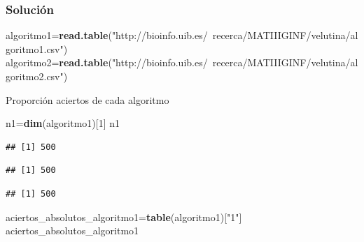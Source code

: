 \documentclass[
]{article}
\newenvironment{Shaded}{\begin{snugshade}}{\end{snugshade}}
\newcommand{\DecValTok}[1]{\textcolor[rgb]{0.00,0.00,0.81}{#1}}
\newcommand{\KeywordTok}[1]{\textcolor[rgb]{0.13,0.29,0.53}{\textbf{#1}}}
\newcommand{\NormalTok}[1]{#1}
\newcommand{\OperatorTok}[1]{\textcolor[rgb]{0.81,0.36,0.00}{\textbf{#1}}}
\newcommand{\StringTok}[1]{\textcolor[rgb]{0.31,0.60,0.02}{#1}}
\begin{document}
\hypertarget{soluciuxf3n}{%
\subsubsection{Solución}\label{soluciuxf3n}}

\begin{Shaded}
\begin{Highlighting}[]
\NormalTok{algoritmo1=}\KeywordTok{read.table}\NormalTok{(}\StringTok{"http://bioinfo.uib.es/~recerca/MATIIIGINF/velutina/algoritmo1.csv"}\NormalTok{)}
\NormalTok{algoritmo2=}\KeywordTok{read.table}\NormalTok{(}\StringTok{"http://bioinfo.uib.es/~recerca/MATIIIGINF/velutina/algoritmo2.csv"}\NormalTok{)}
\end{Highlighting}
\end{Shaded}

Proporción aciertos de cada algoritmo

\begin{Shaded}
\begin{Highlighting}[]
\NormalTok{n1=}\KeywordTok{dim}\NormalTok{(algoritmo1)[}\DecValTok{1}\NormalTok{]}
\NormalTok{n1}
\end{Highlighting}
\end{Shaded}

\begin{verbatim}
## [1] 500
\end{verbatim}

\begin{Shaded}
\end{Shaded}

\begin{verbatim}
## [1] 500
\end{verbatim}

\begin{Shaded}
\end{Shaded}

\begin{verbatim}
## [1] 500
\end{verbatim}

\begin{Shaded}
\begin{Highlighting}[]
\NormalTok{aciertos_absolutos_algoritmo1=}\KeywordTok{table}\NormalTok{(algoritmo1)[}\StringTok{"1"}\NormalTok{]}
\NormalTok{aciertos_absolutos_algoritmo1}
\end{Highlighting}
\end{Shaded}
\end{document}
